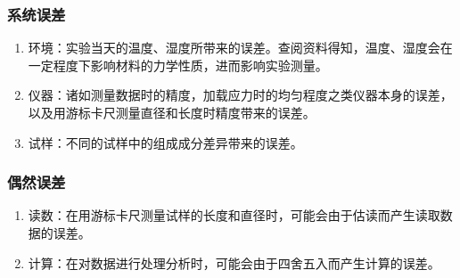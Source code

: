 \subsubsection{系统误差}
\begin{enumerate}
    \item 环境：实验当天的温度、湿度所带来的误差。查阅资料得知，温度、湿度会在一定程度下影响材料的力学性质，进而影响实验测量。
    \item 仪器：诸如测量数据时的精度，加载应力时的均匀程度之类仪器本身的误差，以及用游标卡尺测量直径和长度时精度带来的误差。
    \item 试样：不同的试样中的组成成分差异带来的误差。
\end{enumerate}
\subsubsection{偶然误差}
\begin{enumerate}
    \item 读数：在用游标卡尺测量试样的长度和直径时，可能会由于估读而产生读取数据的误差。
    \item 计算：在对数据进行处理分析时，可能会由于四舍五入而产生计算的误差。
\end{enumerate}
